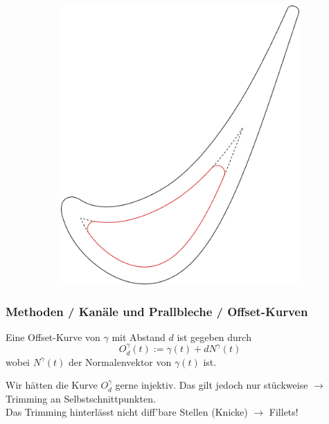 \documentclass[8pt, aspectratio=169]{beamer}
\begin{document}
\begin{frame}
\begin{figure}
\begin{subfigure}[t]{.49\textwidth}
			\includegraphics[height=.8\textheight]{../tec/shrinking/trimming.png}
		\end{subfigure}
	\end{figure}
\end{frame}

\begin{frame}
	\frametitle{Methoden / Kanäle und Prallbleche / Offset-Kurven}
	\vspace{-1cm}\hspace{-0.5cm}
	\begin{minipage}[t]{\textwidth}
		Eine Offset-Kurve von $\gamma$ mit Abstand $d$ ist gegeben durch
			$$ O^\gamma_d(t) := \gamma(t) + dN^\gamma(t)$$
		wobei $N^\gamma(t)$ der Normalenvektor von $\gamma(t)$ ist.
	\end{minipage}
	\begin{figure}[H]
		\centering
		\begin{subfigure}{0.49\textwidth}
			
		\end{subfigure}
		\begin{subfigure}{0.49\textwidth}
			
		\end{subfigure}
	\end{figure}
	\hspace{-0.5cm}
	\begin{minipage}[t]{\textwidth}
		Wir hätten die Kurve $O^\gamma_d$ gerne injektiv. Das gilt jedoch nur stückweise $\rightarrow$ Trimming an Selbstschnittpunkten.\\
		Das Trimming hinterlässt nicht diff'bare Stellen (Knicke) $\rightarrow$ Fillets!
	\end{minipage}
\end{frame}
\end{document}
